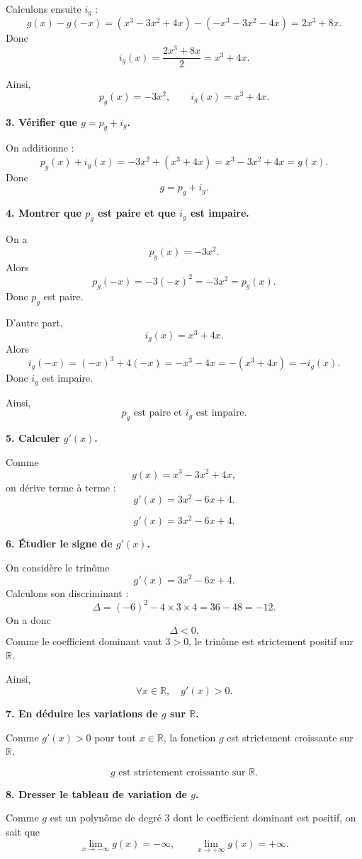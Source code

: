 \documentclass[11pt,a4paper]{article}
\newcommand{\R}{\mathbb{R}}
\begin{document}
Calculons ensuite \(i_g\) :
\[
g(x)-g(-x)
=(x^3-3x^2+4x)-(-x^3-3x^2-4x)
=2x^3+8x.
\]
Donc
\[
i_g(x)=\frac{2x^3+8x}{2}=x^3+4x.
\]

Ainsi,
\[
\boxed{p_g(x)=-3x^2,\qquad i_g(x)=x^3+4x.}
\]

\bigskip

\textbf{3. Vérifier que \(g=p_g+i_g\).}

On additionne :
\[
p_g(x)+i_g(x)=-3x^2+(x^3+4x)=x^3-3x^2+4x=g(x).
\]
Donc
\[
\boxed{g=p_g+i_g.}
\]

\bigskip

\textbf{4. Montrer que \(p_g\) est paire et que \(i_g\) est impaire.}

On a
\[
p_g(x)=-3x^2.
\]
Alors
\[
p_g(-x)=-3(-x)^2=-3x^2=p_g(x).
\]
Donc \(p_g\) est paire.

D'autre part,
\[
i_g(x)=x^3+4x.
\]
Alors
\[
i_g(-x)=(-x)^3+4(-x)=-x^3-4x=-(x^3+4x)=-i_g(x).
\]
Donc \(i_g\) est impaire.

Ainsi,
\[
\boxed{p_g \text{ est paire et } i_g \text{ est impaire.}}
\]

\bigskip

\textbf{5. Calculer \(g'(x)\).}

Comme
\[
g(x)=x^3-3x^2+4x,
\]
on dérive terme à terme :
\[
g'(x)=3x^2-6x+4.
\]

\[
\boxed{g'(x)=3x^2-6x+4.}
\]

\bigskip

\textbf{6. Étudier le signe de \(g'(x)\).}

On considère le trinôme
\[
g'(x)=3x^2-6x+4.
\]
Calculons son discriminant :
\[
\Delta=(-6)^2-4\times 3\times 4=36-48=-12.
\]
On a donc
\[
\Delta<0.
\]
Comme le coefficient dominant vaut \(3>0\), le trinôme est strictement positif sur \(\R\).

Ainsi,
\[
\boxed{\forall x\in\R,\quad g'(x)>0.}
\]

\bigskip

\textbf{7. En déduire les variations de \(g\) sur \(\R\).}

Comme \(g'(x)>0\) pour tout \(x\in\R\), la fonction \(g\) est strictement croissante sur \(\R\).

\[
\boxed{g \text{ est strictement croissante sur } \R.}
\]

\bigskip

\textbf{8. Dresser le tableau de variation de \(g\).}

Comme \(g\) est un polynôme de degré \(3\) dont le coefficient dominant est positif, on sait que
\[
\lim_{x\to -\infty} g(x)=-\infty,
\qquad
\lim_{x\to +\infty} g(x)=+\infty.
\]
\end{document}
